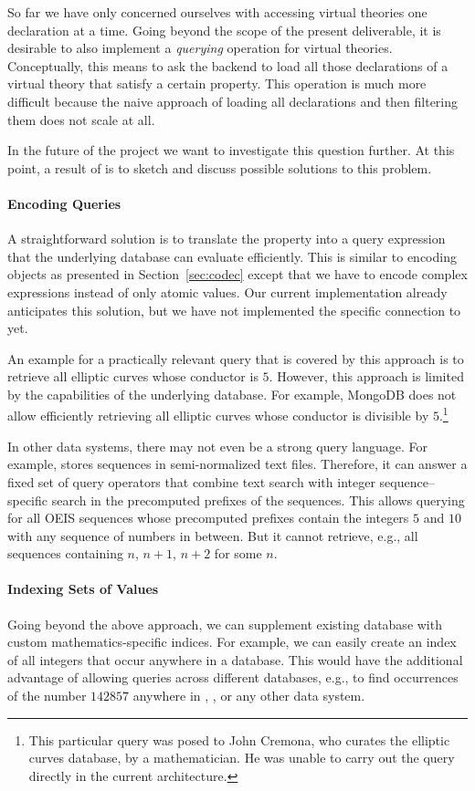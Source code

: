 So far we have only concerned ourselves with accessing virtual theories one declaration at a time.
Going beyond the scope of the present deliverable, it is desirable to also implement a \emph{querying} operation for virtual theories.
Conceptually, this means to ask the \MMT backend to load all those declarations of a virtual theory that satisfy a certain property.
This operation is much more difficult because the naive approach of loading all declarations and then filtering them does not scale at all.

In the future of the \pn project we want to investigate this question further.
At this point, a result of \pn is to sketch and discuss possible solutions to this problem.

\paragraph{Encoding Queries}
A straightforward solution is to translate the property into a query expression that the underlying database can evaluate efficiently.
This is similar to encoding objects as presented in Section~\ref{sec:codec} except that we have to encode complex expressions instead of only atomic values.
Our current implementation already anticipates this solution, but we have not implemented the specific connection to \LMFDB yet.

An example for a practically relevant query that is covered by this approach is to retrieve all elliptic curves whose conductor is $5$.
However, this approach is limited by the capabilities of the underlying database.
For example, MongoDB does not allow efficiently retrieving all elliptic curves whose conductor is divisible by $5$.\footnote{This particular query was posed to John Cremona, who curates the elliptic curves database, by a mathematician. He was unable to carry out the query directly in the current architecture.}


In other data systems, there may not even be a strong query language.
For example, \OEIS stores sequences in semi-normalized text files.
Therefore, it can answer a fixed set of query operators that combine text search with integer sequence--specific search in the precomputed prefixes of the sequences.
This allows querying for all OEIS sequences whose precomputed prefixes contain the integers $5$ and $10$ with any sequence of numbers in between.
But it cannot retrieve, e.g., all sequences containing $n$, $n+1$, $n+2$ for some $n$.

\paragraph{Indexing Sets of Values}
Going beyond the above approach, we can supplement existing database with custom mathematics-specific indices.
For example, we can easily create an index of all integers that occur anywhere in a database.
This would have the additional advantage of allowing queries across different databases, e.g., to find occurrences of the number $142857$ anywhere in \LMFDB, \OEIS, or any other data system.


